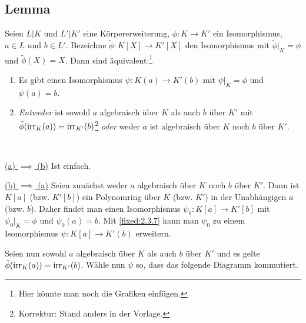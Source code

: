 \subsection{Lemma} Seien $L|K$ und $L'|K'$ eine Körpererweiterung, $\phi : K \to K'$ ein Isomorphismus, $a \in L$ und $b \in L'$. Bezeichne $\tilde \phi : K[X] \to K'[X]$ den Isomorphismus mit $\tilde \phi|_K = \phi$ und $\tilde \phi(X) = X$. Dann sind äquivalent:\footnote{Hier könnte man noch die Grafiken einfügen.}

\begin{enumerate}[label=(\alph*)]
	\item
		Es gibt einen Isomorphismus $\psi : K(a) \to K'(b)$ mit $\psi|_K = \phi$ und $\psi(a) = b$.
	
	\item
		\textit{Entweder} ist sowohl $a$ algebraisch über $K$ als auch $b$ über $K'$ mit $\tilde \phi (\operatorname{irr}_K(a)) = \operatorname{irr}_{K'}(b)$\footnote{Korrektur: Stand anders in der Vorlage.} \textit{oder} weder $a$ ist algebraisch über $K$ noch $b$ über $K'$.
\end{enumerate}

\proof ~

\underline{(a) $\implies$ (b)} Ist einfach.

\underline{(b) $\implies$ (a)} Seien zunächst weder $a$ algebraisch über $K$ noch $b$ über $K'$. Dann ist $K[a]$ (bzw. $K'[b]$) ein Polynomring über $K$ (bzw. $K'$) in der Unabhängigen $a$ (bzw. $b$). Daher findet man einen Isomorphismus $\psi_0 : K[a] \to K'[b]$ mit $\psi_0|_K = \phi$ und $\psi_0(a) = b$. Mit \ref{fixed:2.3.7} kann man $\psi_0$ zu einem Isomorphismus $\psi : K[a] \to K'(b)$ erweitern.

Seien nun sowohl $a$ algebraisch über $K$ als auch $b$ über $K'$ und es gelte $\tilde \phi(\operatorname{irr}_K(a)) = \operatorname{irr}_{K'}(b)$. Wähle nun $\psi$ so, dass das folgende Diagramm kommutiert.

